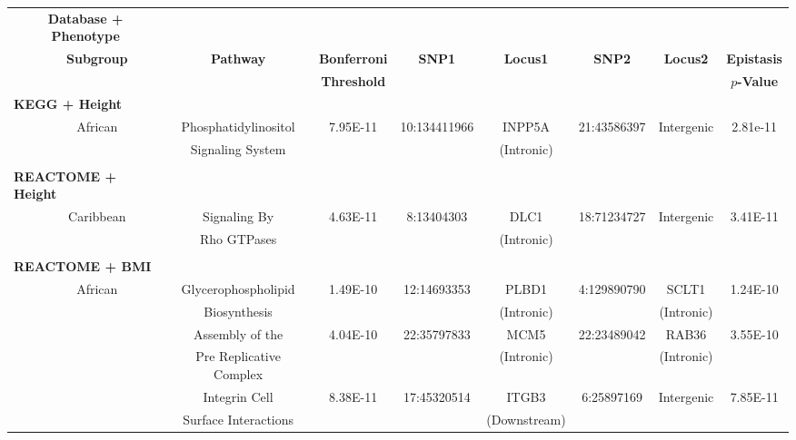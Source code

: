 \documentclass[12pt,a4paper]{article}
\begin{document}
\setlength{\footskip}{3.5cm}
\begin{landscape}
\begin{table}[ht]
\centering
\vspace{-1cm}
\hspace*{-2.5cm}
\begin{tabular}{ccccccccc}
  \hline
  \multicolumn{2}{c}{\textbf{Database + Phenotype}} & & & & & & & \\
  \cline{1-2}
  & \textbf{Subgroup} & \textbf{Pathway} & \textbf{Bonferroni} & \textbf{SNP1} & \textbf{Locus1} & \textbf{SNP2} & \textbf{Locus2} & \textbf{Epistasis} \\
  & & & \textbf{Threshold} & & & & & \textbf{$p$-Value}\\
  \hline
 \multicolumn{2}{l}{\textbf{KEGG + Height}} & & & & & & & \\
 & African & Phosphatidylinositol & 7.95E-11 & 10:134411966 & INPP5A & 21:43586397 & Intergenic & 2.81e-11 \\
 & & Signaling System & & & (Intronic) & & & \\
 & & & & & & & & \\
 \multicolumn{2}{l}{\textbf{REACTOME + Height}} & & & &  & & & \\
 & Caribbean & Signaling By & 4.63E-11 & 8:13404303 & DLC1 & 18:71234727 & Intergenic & 3.41E-11\\
 & & Rho GTPases & & & (Intronic) & & & \\
 & & & & & &  & & \\
 \multicolumn{2}{l}{\textbf{REACTOME + BMI}} & & &  & & & & \\
 & African & Glycerophospholipid & 1.49E-10 & 12:14693353 &  PLBD1 & 4:129890790 & SCLT1 & 1.24E-10 \\
 & & Biosynthesis & & & (Intronic) & & (Intronic) & \\
 & & Assembly of the & 4.04E-10 & 22:35797833 &  MCM5 & 22:23489042 & RAB36 & 3.55E-10 \\
 & & Pre Replicative Complex & & & (Intronic) & & (Intronic) & \\
 & & Integrin Cell & 8.38E-11 & 17:45320514 &  ITGB3 & 6:25897169  & Intergenic & 7.85E-11 \\
 & & Surface Interactions & & & (Downstream) & & & \\ 
   \hline
\end{tabular}

\end{table}
\end{landscape}
\end{document}
